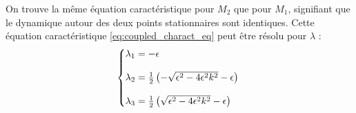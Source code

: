 %
On trouve la même équation caractéristique pour $M_2$ que pour $M_1$, signifiant que le dynamique autour des
deux points stationnaires sont identiques. Cette équation caractéristique \eqref{eq:coupled_charact_eq} peut être résolu pour $\lambda$ :
%
\begin{equation}
  \left\{\begin{array}{@{}l@{}}
    \lambda_1 = -\epsilon \\
    \\
    \lambda_2 = \frac{1}{2}\left(  -\sqrt{\epsilon^2 - 4\epsilon^2k^2} - \epsilon \right) \\
    \\
    \lambda_3 = \frac{1}{2}\left( \sqrt{\epsilon^2 - 4\epsilon^2k^2} - \epsilon \right)
  \end{array}\right.\,
\end{equation}
%
